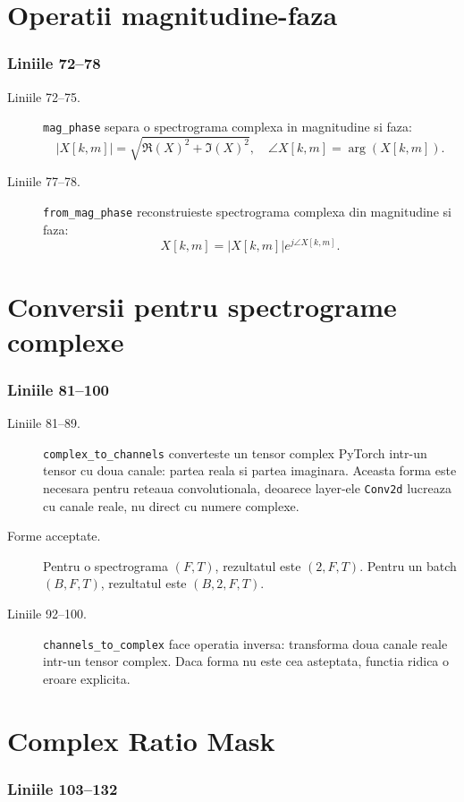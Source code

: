 \documentclass[12pt,a4paper]{report}
\newcommand{\codechunk}[2]{%
\subsection*{Liniile #1--#2}

}
\begin{document}
\chapter{Operatii magnitudine-faza}

\codechunk{72}{78}

\begin{description}
    \item[Liniile 72--75.] \texttt{mag\_phase} separa o spectrograma complexa in
    magnitudine si faza:
    \[
    |X[k,m]| = \sqrt{\Re(X)^2 + \Im(X)^2},
    \quad
    \angle X[k,m] = \arg(X[k,m]).
    \]

    \item[Liniile 77--78.] \texttt{from\_mag\_phase} reconstruieste spectrograma
    complexa din magnitudine si faza:
    \[
    X[k,m] = |X[k,m]|e^{j\angle X[k,m]}.
    \]
\end{description}

\chapter{Conversii pentru spectrograme complexe}

\codechunk{81}{100}

\begin{description}
    \item[Liniile 81--89.] \texttt{complex\_to\_channels} converteste un tensor
    complex PyTorch intr-un tensor cu doua canale: partea reala si partea imaginara.
    Aceasta forma este necesara pentru reteaua convolutionala, deoarece layer-ele
    \texttt{Conv2d} lucreaza cu canale reale, nu direct cu numere complexe.

    \item[Forme acceptate.] Pentru o spectrograma \((F,T)\), rezultatul este
    \((2,F,T)\). Pentru un batch \((B,F,T)\), rezultatul este \((B,2,F,T)\).

    \item[Liniile 92--100.] \texttt{channels\_to\_complex} face operatia inversa:
    transforma doua canale reale intr-un tensor complex. Daca forma nu este cea
    asteptata, functia ridica o eroare explicita.
\end{description}

\chapter{Complex Ratio Mask}

\codechunk{103}{132}
\end{document}
